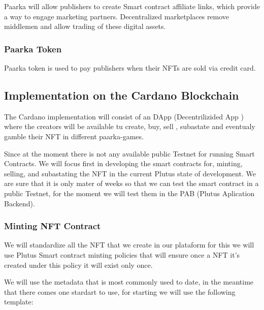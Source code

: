 \documentclass[a4paper,11pt]{article}
\begin{document}
\begin{multicols}{2}
	Paarka will allow publishers to create Smart contract affiliate links, which provide a way to engage marketing partners. Decentralized marketplaces remove middlemen and allow  trading of these digital assets.
	
\subsubsection{Paarka Token}
Paarka token is used to pay publishers when their NFTs are sold via credit card.



\end{multicols}
\subsection{ Implementation on the Cardano Blockchain
	} 

The Cardano implementation will consist of an DApp (Decentrilizided App )  where the creators will be available tu create, buy, sell , subastate and eventualy  gamble their NFT in different paarka-games.

Since at the moment there is not any available public Testnet  for running Smart Contracts. We will focus first in developing the smart contracts for, minting, selling, and subastating the NFT in the current Plutus state of development. We are sure that it is only mater of  weeks so that we can test the smart contract in a public Testnet, for the moment we will test them in the  PAB (Plutus Aplication Backend).

\subsubsection{Minting NFT Contract}


We will standardize all the NFT that we create in our plataform for this we will use Plutus Smart contract minting policies that will ensure once a NFT it's created under this policy it will exist only once.

We will use the metadata that is most commonly used to date, in the meantime that there comes one stardart to use, for starting we will use the following template:
\end{document}

